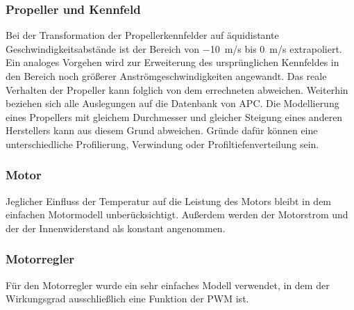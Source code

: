 \subsubsection{Propeller und Kennfeld}
Bei der Transformation der Propellerkennfelder auf äquidistante Geschwindigkeitsabstände ist der Bereich von \SI{-10}{m/s} bis \SI{0}{m/s} extrapoliert. Ein analoges Vorgehen wird zur Erweiterung des ursprünglichen Kennfeldes in den Bereich noch größerer Anströmgeschwindigkeiten angewandt. Das reale Verhalten der Propeller kann folglich von dem errechneten abweichen. Weiterhin beziehen sich alle Auslegungen auf die Datenbank von APC. 
Die Modellierung eines Propellers mit gleichem Durchmesser und gleicher Steigung eines anderen Herstellers kann aus diesem Grund abweichen. Gründe dafür können eine unterschiedliche Profilierung, Verwindung oder Profiltiefenverteilung sein. 

\subsubsection{Motor}
Jeglicher Einfluss der Temperatur auf die Leistung des Motors bleibt in dem einfachen Motormodell unberücksichtigt. Außerdem werden der Motorstrom und der der Innenwiderstand als konstant angenommen.

\subsubsection{Motorregler}
Für den Motorregler wurde ein sehr einfaches Modell verwendet, in dem der Wirkungsgrad ausschließlich eine Funktion der PWM ist.

